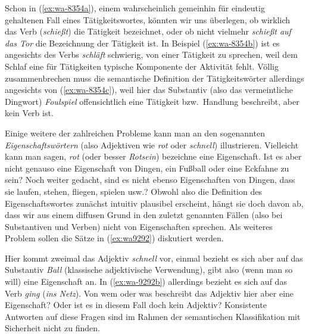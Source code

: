 Schon in (\ref{ex:wa-8354a}), einem wahrscheinlich gemeinhin für eindeutig gehaltenen Fall eines Tätigkeitswortes, könnten wir uns überlegen, ob wirklich das Verb (\textit{schießt}) die Tätigkeit bezeichnet, oder ob nicht vielmehr \textit{schießt auf das Tor} die Bezeichnung der Tätigkeit ist.
In Beispiel (\ref{ex:wa-8354b}) ist es angesichts des Verbs \textit{schläft} schwierig, von einer Tätigkeit zu sprechen, weil dem Schlaf eine für Tätigkeiten typische Komponente der Aktivität fehlt.
Völlig zusammenbrechen muss die semantische Definition der Tätigkeitswörter allerdings angesichts von (\ref{ex:wa-8354c}), weil hier das Substantiv (also das vermeintliche Dingwort) \textit{Foulspiel} offensichtlich eine Tätigkeit bzw.\ Handlung beschreibt, aber kein Verb ist.

Einige weitere der zahlreichen Probleme kann man an den sogenannten \textit{Eigenschaftswörtern} (also Adjektiven wie \textit{rot} oder \textit{schnell}) illustrieren.
Vielleicht kann man sagen, \textit{rot} (oder besser \textit{Rotsein}) bezeichne eine Eigenschaft.
Ist es aber nicht genauso eine Eigenschaft von Dingen, ein Fußball oder eine Eckfahne zu sein?
Noch weiter gedacht, sind es nicht ebenso Eigenschaften von Dingen, dass sie laufen, stehen, fliegen, spielen usw.?
Obwohl also die Definition des Eigenschaftswortes zunächst intuitiv plausibel erscheint, hängt sie doch davon ab, dass wir aus einem diffusen Grund in den zuletzt genannten Fällen (also bei Substantiven und Verben) nicht von Eigenschaften sprechen.
Als weiteres Problem sollen die Sätze in (\ref{ex:wa9292}) diskutiert werden.

\begin{exe}
  \ex \label{ex:wa9292}
  \begin{xlist}
  \end{xlist}
\end{exe}


Hier kommt zweimal das Adjektiv \textit{schnell} vor, einmal bezieht es sich aber auf das Substantiv \textit{Ball} (klassische adjektivische Verwendung), gibt also (wenn man so will) eine Eigenschaft an.
In (\ref{ex:wa-9292b}) allerdings bezieht es sich auf das Verb \textit{ging} (\textit{ins Netz}).
Von wem oder was beschreibt das Adjektiv hier aber eine Eigenschaft?
Oder ist es in diesem Fall doch kein Adjektiv?
Konsistente Antworten auf diese Fragen sind im Rahmen der semantischen Klassifikation mit Sicherheit nicht zu finden.


